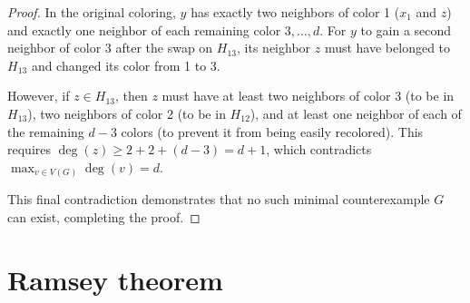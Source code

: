 \documentclass[11pt, a4paper]{ctexrep}
\begin{document}
\begin{proof}
    In the original coloring, $y$ has exactly two neighbors of color 1 ($x_1$ and $z$)
    and exactly one neighbor of each remaining color $3, \dots, d$.
    For $y$ to gain a second neighbor of color 3 after the swap on $H_{13}$,
    its neighbor $z$ must have belonged to $H_{13}$ and changed its color from 1 to 3.
    \begin{center}
        \qquad
    \end{center}

    However, if $z \in H_{13}$, then $z$ must have at least two neighbors of color 3 (to be in $H_{13}$),
    two neighbors of color 2 (to be in $H_{12}$), and at least one neighbor of each of the remaining $d-3$ colors
    (to prevent it from being easily recolored).
    This requires $\deg(z) \ge 2 + 2 + (d-3) = d+1$, which contradicts $\max_{v \in V(G)} \deg(v) = d$.

    This final contradiction demonstrates that no such minimal counterexample $G$ can exist, completing the proof.
\end{proof}

\section{Ramsey theorem}
\end{document}
